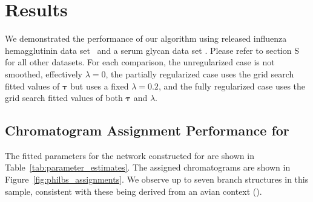 \section{Results}
We demonstrated the performance of our algorithm using released influenza hemagglutinin
data set \philbs \ and a serum glycan data set \rphumanserum. Please refer to section
S for all other datasets. For each comparison, the
unregularized case is not smoothed, effectively $\lambda = 0$, the partially regularized
case uses the grid search fitted values of $\mathbf{\tau}$ but uses a fixed $\lambda = 0.2$,
and the fully regularized case uses the grid search fitted values of both $\mathbf{\tau}$
and $\lambda$.




\subsection{Chromatogram Assignment Performance for \philbs}
    The fitted parameters for the network constructed for \philbs are shown in
    Table~\ref{tab:parameter_estimates}. The assigned chromatograms are shown in
    Figure~\ref{fig:philbs_assignments}. We observe up to seven branch structures in
    this sample, consistent with these \nglycans being derived from an avian context
    (\cite{Stanley2009,Khatri2016a}).

